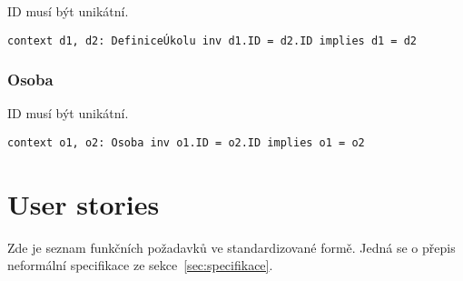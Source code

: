 ID musí být unikátní.

\begin{verbatim}
context d1, d2: DefiniceÚkolu inv d1.ID = d2.ID implies d1 = d2
\end{verbatim}

\subsubsection{Osoba}

ID musí být unikátní.

\begin{verbatim}
context o1, o2: Osoba inv o1.ID = o2.ID implies o1 = o2
\end{verbatim}

\section{User stories}\label{sec:user-stories}

Zde je seznam funkčních požadavků ve standardizované formě.
Jedná se o přepis neformální specifikace ze sekce~\ref{sec:specifikace}.


